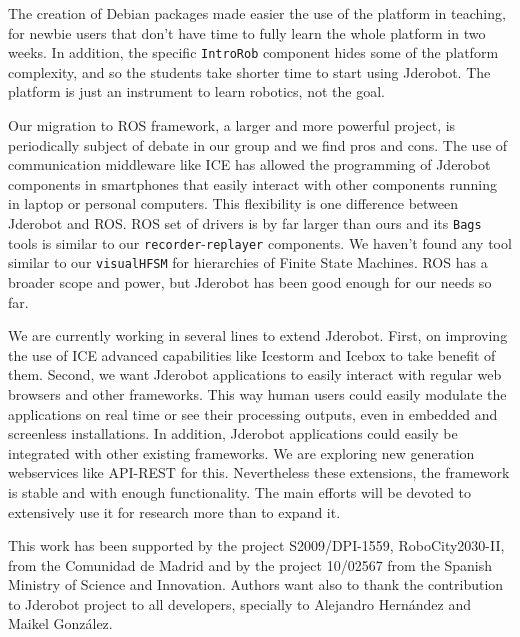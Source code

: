 \documentclass[twocolumn]{svjour3}          %
\begin{document}
The creation of Debian packages made easier the use of the platform in teaching, for newbie users that don't have time to fully learn the whole platform in two weeks. In addition, the specific \texttt{IntroRob} component hides some of the platform complexity, and so the students take shorter time to start using Jderobot. The platform is just an instrument to learn robotics, not the goal.

Our migration to ROS framework, a larger and more powerful project, is periodically subject of debate in our group and we find pros and cons. The use of communication middleware like ICE has allowed the programming of Jderobot components in smartphones that easily interact with other components running in laptop or personal computers. This flexibility is one difference between Jderobot and ROS. ROS set of drivers is by far larger than ours and its \texttt{Bags} tools is similar to our \texttt{recorder}-\texttt{replayer} components. We haven't found any tool similar to our \texttt{visualHFSM} for hierarchies of Finite State Machines. ROS has a broader scope and power, but Jderobot has been good enough for our needs so far. 

We are currently working in several lines to extend Jderobot. First, on improving the use of ICE advanced capabilities like Icestorm and Icebox to take benefit of them. Second, we want Jderobot applications to easily interact with regular web browsers and other frameworks. This way human users could easily modulate the applications on real time or see their processing outputs, even in embedded and screenless installations. In addition, Jderobot applications could easily be integrated with other existing frameworks. We are exploring new generation webservices like API-REST for this. Nevertheless these extensions, the framework is stable and with enough functionality. The main efforts will be devoted to extensively use it for research more than to expand it.


\begin{acknowledgements}
This work has been supported by the project S2009/DPI-1559, RoboCity2030-II, from the Comunidad de Madrid and by the project 10/02567 from the Spanish Ministry of Science and Innovation. Authors want also to thank the contribution to Jderobot project to all developers, specially to Alejandro Hernández and Maikel González.
\end{acknowledgements}

  
\end{document}
